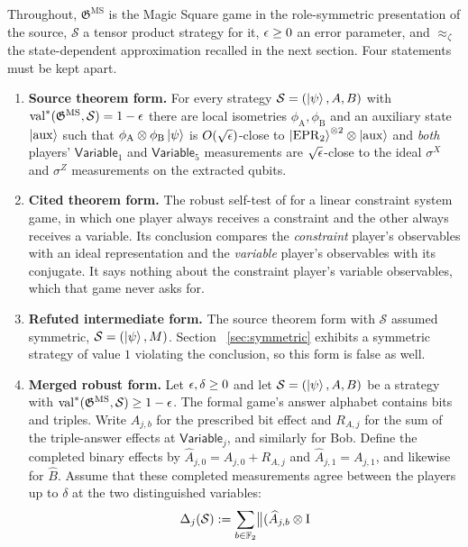 \documentclass[11pt]{article}
\newcommand{\val}{\operatorname{val}}
\newcommand{\game}{\mathfrak{G}}
\newcommand{\strategy}{\mathcal{S}}
\newcommand{\MS}{\mathrm{MS}}
\newcommand{\EPR}{\mathrm{EPR}}
\newcommand{\aux}{\mathrm{aux}}
\newcommand{\Id}{\mathrm{I}}
\newcommand{\Variable}{\mathsf{Variable}}
\begin{document}
Throughout, $\game^{\MS}$ is the Magic Square game in the role-symmetric
presentation of the source, $\strategy$ a tensor product strategy for it,
$\epsilon \ge 0$ an error parameter, and $\approx_\zeta$ the state-dependent
approximation recalled in the next section.  Four statements must be kept
apart.
\begin{enumerate}
  \item \textbf{Source theorem form.}  For every strategy
  $\strategy = (\ket{\psi}, A, B)$ with
  $\val^*(\game^{\MS}, \strategy) = 1-\eps$ there are local isometries
  $\phi_{\mathrm A}, \phi_{\mathrm B}$ and an auxiliary state $\ket{\aux}$ such
  that $\phi_{\mathrm A} \otimes \phi_{\mathrm B} \ket{\psi}$ is $O(\sqrt{\epsilon})$-close
  to $\ket{\EPR_2}^{\ot 2} \ot \ket{\aux}$ and \emph{both} players'
  $\Variable_1$ and $\Variable_5$ measurements are $\sqrt{\epsilon}$-close to the
  ideal $\sigma^X$ and $\sigma^Z$ measurements on the extracted qubits.
  \item \textbf{Cited theorem form.}  The robust self-test of
  \cite[Theorem~6.9]{Coladangelo2017Robust} for a linear constraint system
  game, in which one player always receives a constraint and the other always
  receives a variable.  Its conclusion compares the \emph{constraint} player's
  observables with an ideal representation and the \emph{variable} player's
  observables with its conjugate.  It says nothing about the constraint
  player's variable observables, which that game never asks for.
  \item \textbf{Refuted intermediate form.}  The source theorem form with
  $\strategy$ assumed symmetric, $\strategy = (\ket{\psi}, M)$.  Section~%
  \ref{sec:symmetric} exhibits a symmetric strategy of value $1$ violating the
  conclusion, so this form is false as well.
  \item \textbf{Merged robust form.} Let $\epsilon, \delta \ge 0$ and let
  $\strategy = (\ket{\psi}, A, B)$ be a strategy with
  $\val^*(\game^{\MS}, \strategy) \ge 1-\eps$. The formal game's answer
  alphabet contains bits and triples. Write $A_{j,b}$ for the prescribed bit
  effect and $R_{A,j}$ for the sum of the triple-answer effects at
  $\Variable_j$, and similarly for Bob. Define the completed binary effects
  by $\widehat A_{j,0}=A_{j,0}+R_{A,j}$ and
  $\widehat A_{j,1}=A_{j,1}$, and likewise for $\widehat B$.
  Assume that these completed measurements agree between the players up to
  $\delta$ at the two distinguished variables:
  \begin{equation}
    \Delta_j(\strategy) :=
    \sum_{b \in \F_2} \bigl\| (\widehat A_{j,b} \ot \Id

\end{equation}
\end{enumerate}
\end{document}
